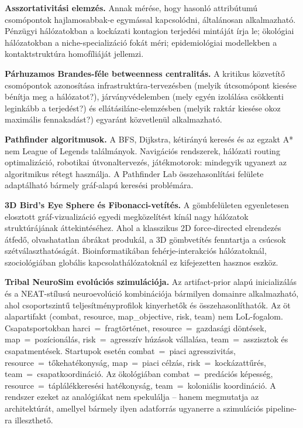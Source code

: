 \textbf{Asszortativitási elemzés.} Annak mérése, hogy hasonló attribútumú csomópontok
hajlamosabbak-e egymással kapcsolódni, általánosan alkalmazható. Pénzügyi hálózatokban
a kockázati kontagion terjedési mintáját írja le; ökológiai hálózatokban a niche-specializáció
fokát méri; epidemiológiai modellekben a kontaktstruktúra homofíliáját jellemzi.

\textbf{Párhuzamos Brandes-féle betweenness centralitás.} A kritikus közvetítő csomópontok
azonosítása infrastruktúra-tervezésben (melyik útcsomópont kiesése bénítja meg a hálózatot?),
járványvédelemben (mely egyén izolálása csökkenti leginkább a terjedést?) és
ellátásilánc-elemzésben (melyik raktár kiesése okoz maximális fennakadást?) egyaránt
közvetlenül alkalmazható.

\textbf{Pathfinder algoritmusok.} A BFS, Dijkstra, kétirányú keresés és az egzakt A* nem
League of Legends találmányok. Navigációs rendszerek, hálózati routing optimalizáció,
robotikai útvonaltervezés, játékmotorok: mindegyik ugyanezt az algoritmikus rétegt
használja. A Pathfinder Lab összehasonlítási felülete adaptálható bármely gráf-alapú
keresési problémára.

\textbf{3D Bird's Eye Sphere és Fibonacci-vetítés.} A gömbfelületen egyenletesen elosztott
gráf-vizualizáció egyedi megközelítést kínál nagy hálózatok struktúrájának áttekintéséhez.
Ahol a klasszikus 2D force-directed elrendezés átfedő, olvashatatlan ábrákat produkál,
a 3D gömbvetítés fenntartja a csúcsok szétválaszthatóságát. Bioinformatikában fehérje-interakciós
hálózatoknál, szociológiában globális kapcsolathálózatoknál ez kifejezetten hasznos eszköz.

\textbf{Tribal NeuroSim evolúciós szimulációja.} Az artifact-prior alapú inicializálás
és a NEAT-stílusú neuroevolúció kombinációja bármilyen domainre alkalmazható, ahol
csoportszintű teljesítményprofilok kinyerhetők és összehasonlíthatók. Az öt
alapartifakt (combat, resource, map\_objective, risk, team) nem LoL-fogalom.
Csapatsportokban harci~=~fragtörténet, resource~=~gazdasági döntések, map~=~pozícionálás,
risk~=~agresszív húzások vállalása, team~=~asszisztok és csapatmentések. Startupok esetén
combat~=~piaci agresszivitás, resource~=~tőkehatékonyság, map~=~piaci célzás, risk~=~kockázattűrés,
team~=~csapatkoordináció. Az ökológiában combat~=~predációs képesség, resource~=~táplálékkeresési
hatékonyság, team~=~koloniális koordináció. A rendszer ezeket az analógiákat nem spekulálja --
hanem megmutatja az architektúrát, amellyel bármely ilyen adatforrás ugyanerre a szimulációs
pipeline-ra illeszthető.


